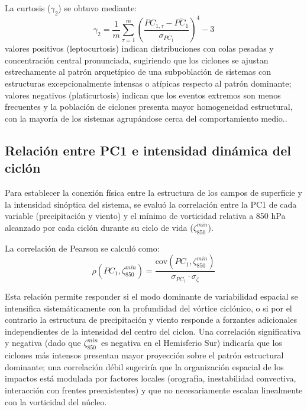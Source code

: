 La curtosis ($\gamma_2$) se obtuvo mediante:
\begin{equation}
    \gamma_2 = \frac{1}{m} \sum_{\tau=1}^{m} \left(\frac{PC_{1,\tau} - \overline{PC_1}}{\sigma_{PC_1}}\right)^4 - 3
\end{equation}
valores positivos (leptocurtosis) indican distribuciones con colas pesadas y concentración central pronunciada, sugiriendo que los ciclones se ajustan estrechamente al patrón arquetípico de una subpoblación de sistemas con estructuras excepcionalmente intensas o atípicas respecto al patrón dominante; valores negativos (platicurtosis) indican que los eventos extremos son menos frecuentes y la población de ciclones presenta mayor homogeneidad estructural, con la mayoría de los sistemas agrupándose cerca del comportamiento medio..

\subsection{Relación entre PC1 e intensidad dinámica del ciclón}\label{subsubsec:pc1_vorticidad}

Para establecer la conexión física entre la estructura de los campos de superficie y la intensidad sinóptica del sistema, se evaluó la correlación entre la PC1 de cada variable (precipitación y viento) y el mínimo de vorticidad relativa a 850 hPa alcanzado por cada ciclón durante su ciclo de vida ($\zeta_{850}^{min}$).

La correlación de Pearson se calculó como:
\begin{equation}
    \rho(PC_1, \zeta_{850}^{min}) = \frac{\text{cov}(PC_1, \zeta_{850}^{min})}{\sigma_{PC_1} \cdot \sigma_{\zeta}}
\end{equation}

Esta relación permite responder si el modo dominante de variabilidad espacial se intensifica sistemáticamente con la profundidad del vórtice ciclónico, o si por el contrario la estructura de precipitación y viento responde a forzantes adicionales independientes de la intensidad del centro del ciclon. Una correlación significativa y negativa (dado que $\zeta_{850}^{min}$ es negativa en el Hemisferio Sur) indicaría que los ciclones más intensos presentan mayor proyección sobre el patrón estructural dominante; una correlación débil sugeriría que la organización espacial de los impactos está modulada por factores locales (orografía, inestabilidad convectiva, interacción con frentes preexistentes) y que no necesariamente escalan linealmente con la vorticidad del núcleo.

